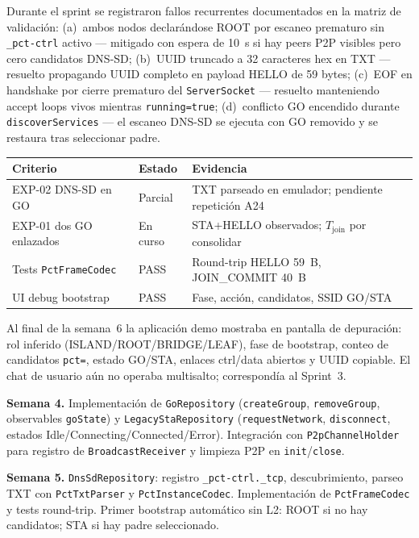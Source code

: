 Durante el sprint se registraron fallos recurrentes documentados en la matriz de validación: (a)~ambos nodos declarándose ROOT por escaneo prematuro sin \texttt{\_pct-ctrl} activo — mitigado con espera de 10~s si hay peers P2P visibles pero cero candidatos DNS-SD; (b)~UUID truncado a 32 caracteres hex en TXT — resuelto propagando UUID completo en payload HELLO de 59 bytes; (c)~EOF en handshake por cierre prematuro del \texttt{ServerSocket} — resuelto manteniendo accept loops vivos mientras \texttt{running=true}; (d)~conflicto GO encendido durante \texttt{discoverServices} — el escaneo DNS-SD se ejecuta con GO removido y se restaura tras seleccionar padre.


\begin{center}
\small
\begin{tabular}{@{}p{3.5cm}p{2cm}p{6.5cm}@{}}
\hline
\textbf{Criterio} & \textbf{Estado} & \textbf{Evidencia} \\
\hline
EXP-02 DNS-SD en GO & Parcial & TXT parseado en emulador; pendiente repetición A24 \\
EXP-01 dos GO enlazados & En curso & STA+HELLO observados; $T_{\mathrm{join}}$ por consolidar \\
Tests \texttt{PctFrameCodec} & PASS & Round-trip HELLO 59~B, JOIN\_COMMIT 40~B \\
UI debug bootstrap & PASS & Fase, acción, candidatos, SSID GO/STA \\
\hline
\end{tabular}
\end{center}

Al final de la semana~6 la aplicación demo mostraba en pantalla de depuración: rol inferido (ISLAND/ROOT/BRIDGE/LEAF), fase de bootstrap, conteo de candidatos \texttt{pct=}, estado GO/STA, enlaces ctrl/data abiertos y UUID copiable. El chat de usuario aún no operaba multisalto; correspondía al Sprint~3.


\textbf{Semana 4.} Implementación de \texttt{GoRepository} (\texttt{createGroup}, \texttt{removeGroup}, observables \texttt{goState}) y \texttt{LegacyStaRepository} (\texttt{requestNetwork}, \texttt{disconnect}, estados Idle/Connecting/Connected/Error). Integración con \texttt{P2pChannelHolder} para registro de \texttt{BroadcastReceiver} y limpieza P2P en \texttt{init}/\texttt{close}.

\textbf{Semana 5.} \texttt{DnsSdRepository}: registro \texttt{\_pct-ctrl.\_tcp}, descubrimiento, parseo TXT con \texttt{PctTxtParser} y \texttt{PctInstanceCodec}. Implementación de \texttt{PctFrameCodec} y tests round-trip. Primer bootstrap automático sin L2: ROOT si no hay candidatos; STA si hay padre seleccionado.

